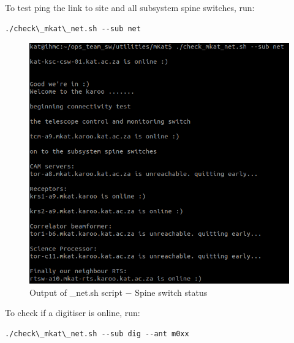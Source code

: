 To test ping the link to site and all subsystem spine switches, run:
\begin{lstlisting}[style=DOS]
./check\_mkat\_net.sh --sub net

\end{lstlisting}



\begin{figure}[!thb]
	\centering
	\includegraphics[scale=0.23]{Chapters/images/image117.png}
	
	\caption{Output of \_net.sh script $-$ Spine switch status}
	\label{fig:image117}
\end{figure}


To check if a digitiser is online, run:
\begin{lstlisting}[style=DOS]
./check\_mkat\_net.sh --sub dig --ant m0xx

\end{lstlisting}




